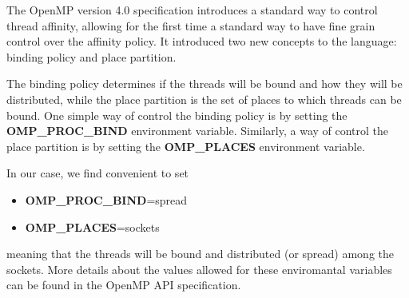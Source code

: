 The OpenMP version 4.0 specification introduces a standard way to control thread affinity, allowing for the first time a standard way to have fine grain control over the affinity policy.  It introduced two new concepts to the language: binding policy and place partition.

The binding policy determines if the threads will be bound and how they will be distributed, while the place partition is the set of places to which threads can be bound. One simple way of control the binding policy is by setting the \textbf{OMP\_PROC\_BIND} environment variable. Similarly, a way of control the place partition is by setting the \textbf{OMP\_PLACES} environment variable. 

In our case, we find convenient to set 

\begin{itemize} 

\item \textbf{OMP\_PROC\_BIND}=spread 

\item \textbf{OMP\_PLACES}=sockets

\end{itemize}

meaning that the threads will be bound and distributed (or spread) among the sockets. More details about the values allowed for these enviromantal variables can be found in the OpenMP API specification.


